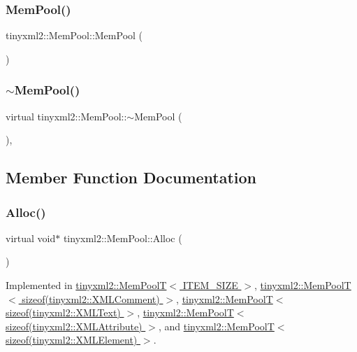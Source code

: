 \subsubsection{\texorpdfstring{Mem\+Pool()}{MemPool()}}
{\footnotesize\ttfamily tinyxml2\+::\+Mem\+Pool\+::\+Mem\+Pool (\begin{DoxyParamCaption}{ }\end{DoxyParamCaption})\hspace{0.3cm}{\ttfamily [inline]}}

\mbox{\label{classtinyxml2_1_1_mem_pool_ae55ad9e3faeca702e6ccbb38fdbcad72}} 
\subsubsection{\texorpdfstring{$\sim$\+Mem\+Pool()}{~MemPool()}}
{\footnotesize\ttfamily virtual tinyxml2\+::\+Mem\+Pool\+::$\sim$\+Mem\+Pool (\begin{DoxyParamCaption}{ }\end{DoxyParamCaption})\hspace{0.3cm}{\ttfamily [inline]}, {\ttfamily [virtual]}}



\subsection{Member Function Documentation}
\mbox{\label{classtinyxml2_1_1_mem_pool_a4f977b5fed752c0bbfe5295f469d6449}} 
\subsubsection{\texorpdfstring{Alloc()}{Alloc()}}
{\footnotesize\ttfamily virtual void$\ast$ tinyxml2\+::\+Mem\+Pool\+::\+Alloc (\begin{DoxyParamCaption}{ }\end{DoxyParamCaption})\hspace{0.3cm}{\ttfamily [pure virtual]}}



Implemented in \hyperlink{classtinyxml2_1_1_mem_pool_t_a810fd2b0caf56b8b688e55f2768f96c7}{tinyxml2\+::\+Mem\+Pool\+T$<$ I\+T\+E\+M\+\_\+\+S\+I\+Z\+E $>$}, \hyperlink{classtinyxml2_1_1_mem_pool_t_a810fd2b0caf56b8b688e55f2768f96c7}{tinyxml2\+::\+Mem\+Pool\+T$<$ sizeof(tinyxml2\+::\+X\+M\+L\+Comment) $>$}, \hyperlink{classtinyxml2_1_1_mem_pool_t_a810fd2b0caf56b8b688e55f2768f96c7}{tinyxml2\+::\+Mem\+Pool\+T$<$ sizeof(tinyxml2\+::\+X\+M\+L\+Text) $>$}, \hyperlink{classtinyxml2_1_1_mem_pool_t_a810fd2b0caf56b8b688e55f2768f96c7}{tinyxml2\+::\+Mem\+Pool\+T$<$ sizeof(tinyxml2\+::\+X\+M\+L\+Attribute) $>$}, and \hyperlink{classtinyxml2_1_1_mem_pool_t_a810fd2b0caf56b8b688e55f2768f96c7}{tinyxml2\+::\+Mem\+Pool\+T$<$ sizeof(tinyxml2\+::\+X\+M\+L\+Element) $>$}.

